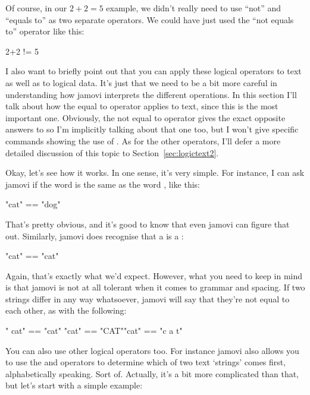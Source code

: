Of course, in our $2+2 = 5$ example, we didn't really need to use ``not''  and ``equals to'' \rtext{==} as two separate operators. We could have just used the ``not equals to'' operator \rtext{!=} like this:

\begin{rblock1}
{2+2 != 5}
\end{rblock1}


I also want to briefly point out that you can apply these logical operators to text as well as to logical data. It's just that we need to be a bit more careful in understanding how jamovi interprets the different operations. In this section I'll talk about how the equal to operator \rtext{==} applies to text, since this is the most important one. Obviously, the not equal to operator \rtext{!=} gives the exact opposite answers to \rtext{==} so I'm implicitly talking about that one too, but I won't give specific commands showing the use of \rtext{!=}. As for the other operators, I'll defer a more detailed discussion of this topic to Section~\ref{sec:logictext2}. 

Okay, let's see how it works. In one sense, it's very simple. For instance, I can ask jamovi if the word  is the same as the word 
, like this:

\begin{rblock1}
"cat" == "dog"
\end{rblock1}

That's pretty obvious, and it's good to know that even jamovi can figure that out. Similarly, jamovi does recognise that a  is a :

\begin{rblock1}
"cat" == "cat"
\end{rblock1}

Again, that's exactly what we'd expect. However, what you need to keep in mind is that jamovi is not at all tolerant when it comes to grammar and spacing. If two strings differ in any way whatsoever, jamovi will say that they're not equal to each other, as with the following: 

\begin{rblock1}
" cat" == "cat"
"cat" == "CAT""cat" == "c a t"
\end{rblock1}

You can also use other logical operators too. For instance jamovi also allows you to use the \rtext{<} and \rtext{>} operators to determine which of two text `strings' comes first, alphabetically speaking. Sort of. Actually, it's a bit more complicated than that, but let's start with a simple example:

